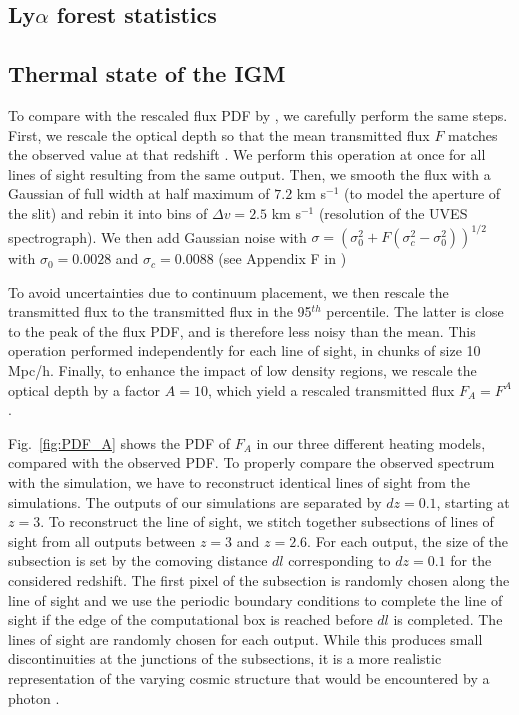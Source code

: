 \documentclass[numberedappendix]{emulateapj}
\begin{document}
\subsection{Ly$\alpha$ forest statistics}



\subsection{Thermal state of the IGM}
To compare with the rescaled flux PDF by \citet{2017MNRAS.466.2690R}, we carefully perform the same steps. First, we rescale the optical depth so that the mean transmitted flux $F$ matches the observed value at that redshift \citep{2013MNRAS.436.1023B}. We perform this operation at once for all lines of sight resulting from the same output.  Then, we smooth the flux with a Gaussian of full width at half maximum of $7.2$ km s$^{-1}$ (to model the aperture of the slit) and rebin it into bins of $\Delta v=2.5$ km s$^{-1}$ (resolution of the UVES spectrograph). We then add Gaussian noise with $\sigma=(\sigma_0^2+F(\sigma_c^2-\sigma_0^2))^{1/2}$ with $\sigma_0=0.0028$ and $\sigma_c=0.0088$ (see Appendix F in \citet{2017MNRAS.466.2690R})

To avoid uncertainties due to continuum placement, we then rescale the transmitted flux to the transmitted flux in the 95$^{th}$ percentile. The latter is close to the peak of the flux PDF, and is therefore less noisy than the mean. This operation performed independently for each line of sight, in chunks of size 10 Mpc/h. Finally, to enhance the impact of low density regions, we rescale the optical depth by a factor $A=10$, which yield a rescaled transmitted flux $F_A=F^A$.


Fig.~\ref{fig:PDF_A} shows the PDF of $F_A$ in our three different heating models, compared with the observed PDF. To properly compare the observed spectrum with the simulation, we have to reconstruct identical lines of sight from the simulations. The outputs of our simulations are separated by $dz=0.1$, starting at $z=3$. To reconstruct the line of sight, we stitch together subsections of lines of sight from all outputs between $z=3$ and $z=2.6$. For each output, the size of the subsection is set by the comoving distance $dl$ corresponding to $dz=0.1$ for the considered redshift. The first pixel of the subsection is randomly chosen along the line of sight and we use the periodic boundary conditions to complete the line of sight if the edge of the computational box is reached before $dl$ is completed. The lines of sight are randomly chosen for each output. While this produces small discontinuities at the junctions of the subsections, it is a more realistic representation of the varying cosmic structure that would be encountered by a photon \citep[see e.g.][for a discussion]{2016arXiv161203935H}. 
\end{document}
